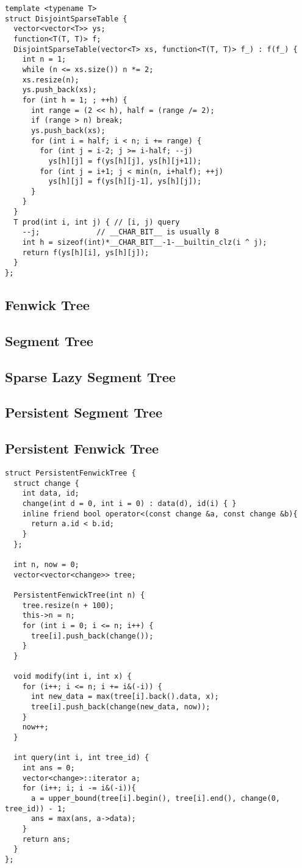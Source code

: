 \begin{lstlisting}
template <typename T>
struct DisjointSparseTable {
  vector<vector<T>> ys;
  function<T(T, T)> f;
  DisjointSparseTable(vector<T> xs, function<T(T, T)> f_) : f(f_) {
    int n = 1;
    while (n <= xs.size()) n *= 2;
    xs.resize(n);
    ys.push_back(xs);
    for (int h = 1; ; ++h) {
      int range = (2 << h), half = (range /= 2);
      if (range > n) break;
      ys.push_back(xs);
      for (int i = half; i < n; i += range) {
        for (int j = i-2; j >= i-half; --j) 
          ys[h][j] = f(ys[h][j], ys[h][j+1]);
        for (int j = i+1; j < min(n, i+half); ++j) 
          ys[h][j] = f(ys[h][j-1], ys[h][j]);
      }
    }
  }
  T prod(int i, int j) { // [i, j) query
    --j;             // __CHAR_BIT__ is usually 8
    int h = sizeof(int)*__CHAR_BIT__-1-__builtin_clz(i ^ j);
    return f(ys[h][i], ys[h][j]);
  }
};
\end{lstlisting}

\subsection{Fenwick Tree}
\subsection{Segment Tree}
\subsection{Sparse Lazy Segment Tree}
\subsection{Persistent Segment Tree}

\newpage

\subsection{Persistent Fenwick Tree}

\begin{lstlisting}
struct PersistentFenwickTree {
  struct change {
    int data, id;
    change(int d = 0, int i = 0) : data(d), id(i) { }
    inline friend bool operator<(const change &a, const change &b){
      return a.id < b.id;
    }
  };

  int n, now = 0;
  vector<vector<change>> tree;

  PersistentFenwickTree(int n) {
    tree.resize(n + 100);
    this->n = n;
    for (int i = 0; i <= n; i++) {
      tree[i].push_back(change());
    }
  }
  
  void modify(int i, int x) {
    for (i++; i <= n; i += i&(-i)) {
      int new_data = max(tree[i].back().data, x);
      tree[i].push_back(change(new_data, now));
    }
    now++;
  }

  int query(int i, int tree_id) {
    int ans = 0;
    vector<change>::iterator a;
    for (i++; i; i -= i&(-i)){
      a = upper_bound(tree[i].begin(), tree[i].end(), change(0, tree_id)) - 1;
      ans = max(ans, a->data);
    }
    return ans;
  }
};
\end{lstlisting}

